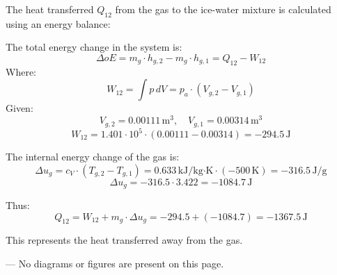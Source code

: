 The heat transferred \( Q_{12} \) from the gas to the ice-water mixture is calculated using an energy balance:  

The total energy change in the system is:  
\[
\Delta oE = m_g \cdot h_{g,2} - m_g \cdot h_{g,1} = Q_{12} - W_{12}
\]  
Where:  
\[
W_{12} = \int p \, dV = p_a \cdot (V_{g,2} - V_{g,1})
\]  
Given:  
\[
V_{g,2} = 0.00111 \, \text{m}^3, \quad V_{g,1} = 0.00314 \, \text{m}^3
\]  
\[
W_{12} = 1.401 \cdot 10^5 \cdot (0.00111 - 0.00314) = -294.5 \, \text{J}
\]  

The internal energy change of the gas is:  
\[
\Delta u_g = c_V \cdot (T_{g,2} - T_{g,1}) = 0.633 \, \text{kJ/kg·K} \cdot (-500 \, \text{K}) = -316.5 \, \text{J/g}
\]  
\[
\Delta u_g = -316.5 \cdot 3.422 = -1084.7 \, \text{J}
\]  

Thus:  
\[
Q_{12} = W_{12} + m_g \cdot \Delta u_g = -294.5 + (-1084.7) = -1367.5 \, \text{J}
\]  

This represents the heat transferred away from the gas.  

---  
No diagrams or figures are present on this page.
